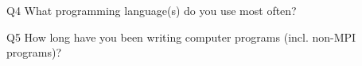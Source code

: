 \begin{description}%
\item{Q4} What programming language(s) do you use most often?%
\item{Q5} How long have you been writing computer programs (incl. non-MPI programs)?%
\end{description}%
